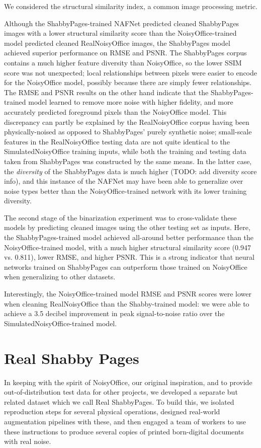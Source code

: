 \documentclass[runningheads]{llncs}
\begin{document}
We considered the structural similarity index, a common image processing metric.

Although the ShabbyPages-trained NAFNet predicted cleaned ShabbyPages images with a lower structural similarity score than the NoisyOffice-trained model predicted cleaned RealNoisyOffice images, the ShabbyPages model achieved superior performance on RMSE and PSNR.
The ShabbyPages corpus contains a much higher feature diversity than NoisyOffice, so the lower SSIM score was not unexpected; local relationships between pixels were easier to encode for the NoisyOffice model, possibly because there are simply fewer relationships.
The RMSE and PSNR results on the other hand indicate that the ShabbyPages-trained model learned to remove more noise with higher fidelity, and more accurately predicted foreground pixels than the NoisyOffice model.
This discrepancy can partly be explained by the RealNoisyOffice corpus having been physically-noised as opposed to ShabbyPages' purely synthetic noise; small-scale features in the RealNoisyOffice testing data are not quite identical to the SimulatedNoisyOffice training inputs, while both the training and testing data taken from ShabbyPages was constructed by the same means.
In the latter case, the \textit{diversity} of the ShabbyPages data is much higher (TODO: add diversity score info), and this instance of the NAFNet may have been able to generalize over noise types better than the NoisyOffice-trained network with its lower training diversity.

The second stage of the binarization experiment was to cross-validate these models by predicting cleaned images using the other testing set as inputs.
Here, the ShabbyPages-trained model achieved all-around better performance than the NoisyOffice-trained model, with a much higher structural similarity score (0.947 vs. 0.811), lower RMSE, and higher PSNR.
This is a strong indicator that neural networks trained on ShabbyPages can outperform those trained on NoisyOffice when generalizing to other datasets.

Interestingly, the NoisyOffice-trained model RMSE and PSNR scores were lower when cleaning RealNoisyOffice than the Shabby-trained model: we were able to achieve a 3.5 decibel improvement in peak signal-to-noise ratio over the SimulatedNoisyOffice-trained model.

\section{Real Shabby Pages}
In keeping with the spirit of NoisyOffice, our original inspiration, and to provide out-of-distribution test data for other projects, we developed a separate but related dataset which we call Real ShabbyPages. To build this, we isolated reproduction steps for several physical operations, designed real-world augmentation pipelines with these, and then engaged a team of workers to use these instructions to produce several copies of printed born-digital documents with real noise.
\end{document}
